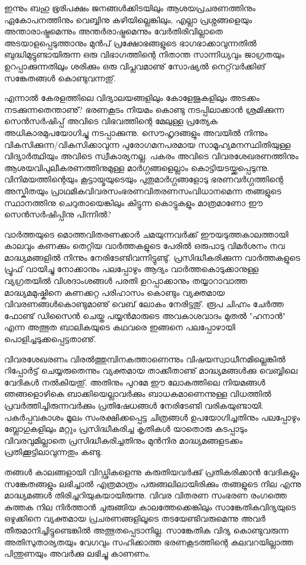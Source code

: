ഇന്നും ബഹു ഭൂരിപക്ഷം ജനങ്ങള്‍ക്കിടയിലും ആശയപ്രചരണത്തിനും ഏകോപനത്തിനും വെബ്ബിനു കഴിയില്ലെങ്കിലും, എല്ലാ 
പ്രശ്നങ്ങളെയും അന്താരാഷ്ട്രമെന്നും അന്തര്‍രാഷ്ട്രമെന്നും വേര്‍തിരിവില്ലാതെ അടയാളപ്പെടുത്താനും മുന്‍പ് പ്രക്ഷോഭങ്ങളുടെ 
ഭാഗഭാക്കാവുന്നതില്‍ ബുദ്ധിമുട്ടുണ്ടായിരുന്ന ഒരു വിഭാഗത്തിന്റെ നിതാന്ത സാന്നിധ്യവും ജാഗ്രതയും ഉറപ്പാക്കുന്നതിലും ശരിക്കും ഒരു 
വിപ്ലവമാണു് സോഷ്യല്‍ നെറ്റ്‌വര്‍ക്കിങ് സങ്കേതങ്ങള്‍ കൊണ്ടുവന്നതു്.

എന്നാല്‍ കേരളത്തിലെ വിദ്യാലയങ്ങളിലും കോളേജുകളിലും അടക്കം നടക്കുന്നതെന്താണു്? ഭരണകൂടം നിയമം കൊണ്ടു 
നടപ്പിലാക്കാന്‍ ശ്രമിക്കുന്ന സെന്‍സര്‍ഷിപ്പ് അവിടെ വിഭവത്തിന്റെ മേലുള്ള പ്രത്യേക അധികാരമുപയോഗിച്ചു നടപ്പാക്കുന്നു. 
സൌഹൃദങ്ങളും അവയില്‍ നിന്നും വികസിക്കുന്ന/വികസിക്കാവുന്ന പുരോഗമനപരമായ സാമൂഹ്യമനസ്ഥിതിയുള്ള വിദ്യാര്‍ത്ഥിയും 
അവിടെ സ്വീകാര്യനല്ല. പകരം അവിടെ വിവരശേഖരണത്തിനും ആശയവിപുലീകരണത്തിനുമുള്ള മാര്‍ഗ്ഗങ്ങളെല്ലാം 
കൊട്ടിയടയ്ക്കപ്പെടുന്നു. വിനിമയത്തിന്റെയും കൂട്ടായ്മയുടെയും പുതുമാര്‍ഗ്ഗങ്ങളോടു ഭരണവര്‍ഗ്ഗത്തിന്റെ അസ്കിതയും 
പ്രാഥമികവിവരസംഭരണവിതരണസംവിധാനമെന്ന തങ്ങളുടെ സ്ഥാനത്തിനു ചെറുതായെങ്കിലും കിട്ടുന്ന കൊട്ടുകളും 
മാത്രമാണോ ഈ സെന്‍സര്‍ഷിപ്പിനു പിന്നില്‍?

വാര്‍ത്തയുടെ മൊത്തവിതരണക്കാര്‍ ചമയുന്നവര്‍ക്ക് ഈയടുത്തകാലത്തായി കാലവും കണക്കും തെറ്റിയ വാര്‍ത്തകളുടെ പേരില്‍ 
ഒരുപാടു വിമര്‍ശനം നവ മാദ്ധ്യമങ്ങളില്‍ നിന്നും നേരിടേണ്ടിവന്നിട്ടുണ്ടു്. പ്രസിദ്ധീകരിക്കുന്ന വാര്‍ത്തകളുടെ പ്രൂഫ് വായിച്ചു നോക്കാനും 
പലപ്പോഴും ആദ്യം വാര്‍ത്തകൊടുക്കാനുള്ള വ്യഗ്രതയില്‍ വിശദാംശങ്ങള്‍ പരതി ഉറപ്പാക്കാനും തയ്യാറാവാത്ത മാദ്ധ്യമമുഷ്കിനെ 
കണക്കറ്റ പരിഹാസം കൊണ്ടും വ്യക്തമായ വിവരണങ്ങള്‍കൊണ്ടുമാണു് വെബ് ലോകം നേരിട്ടതു്. രൂപ ചിഹ്നം ചേര്‍ത്ത ഫോണ്ട് 
ഡിസൈന്‍ ചെയ്ത പയ്യന്‍മാരുടെ അവകാശവാദം മുതല്‍ "ഹനാന്‍" എന്ന അത്ഭുത ബാലികയുടെ കഥവരെ ഇങ്ങനെ പലപ്പോഴായി 
പൊളിച്ചടുക്കപ്പെട്ടതാണു്.

വിവര​ശേഖരണം വിരല്‍ത്തുമ്പിനകത്താണെന്നും വിഷയസ്വാധീനമില്ലെങ്കില്‍ റിപ്പോര്‍ട്ട് ചെയ്യരുതെന്നും വ്യക്തമായ താക്കീതാണു് 
മാദ്ധ്യമങ്ങള്‍ക്കു വെബ്ബിലെ വേദികള്‍ നല്‍കിയതു്. അതിനും പുറമേ ഈ ലോകത്തിലെ നിയമങ്ങള്‍ ഞങ്ങളൊഴികെ 
ബാക്കിയെല്ലാവര്‍ക്കും ബാധകമാണെന്നുള്ള വിധത്തില്‍ പ്രവര്‍ത്തിച്ചിരുന്നവര്‍ക്കും പ്രതിഷേധങ്ങള്‍ നേരിടേണ്ടി വരികയുണ്ടായി.
 പകര്‍പ്പവകാശം മൂലം സംരക്ഷിക്കപ്പെട്ട ചിത്രങ്ങള്‍ ഉപയോഗിച്ചതിനും പലപ്പോഴും ബ്ലോഗുകളിലും മറ്റും പ്രസിദ്ധീകരിച്ച കൃതികള്‍ 
യാതൊരു കടപ്പാടും വിവരവുമില്ലാതെ പ്രസിദ്ധീകരിച്ചതിനും മുന്‍നിര മാദ്ധ്യമങ്ങളടക്കം പ്രതിക്കൂട്ടിലാവുന്നതും കണ്ടു.

തങ്ങള്‍ കാലങ്ങളായി വിഡ്ഢികളെന്നു കരുതിയവര്‍ക്കു് പ്രതികരിക്കാന്‍ വേദികളും സങ്കേതങ്ങളും ലഭിച്ചാല്‍ എത്രമാത്രം 
പരുങ്ങലിലായിരിക്കും തങ്ങളുടെ നില എന്നു മാദ്ധ്യമങ്ങള്‍ തിരിച്ചറിയുകയായിരുന്നു. വിവര വിതരണ സംഭരണ രംഗത്തെ 
കുത്തക നില നിര്‍ത്താന്‍ ചുരുങ്ങിയ കാലത്തേക്കെങ്കിലും സാങ്കേതികവിദ്യയുടെ ഒഴുക്കിനെ വ്യക്തമായ പ്രചരണങ്ങളിലൂടെ 
തടയേണ്ടിവരുമെന്നു അവര്‍ തീരുമാനിച്ചിട്ടുണ്ടെങ്കില്‍ അത്ഭുതപ്പെടാനില്ല. സാങ്കേതിക വിദ്യ കൊണ്ടുവരുന്ന അതിസുതാര്യതയും 
വേഗവും സഹിക്കാത്ത ഭരണകൂടത്തിന്റെ കലവറയില്ലാത്ത പിന്തുണയും അവര്‍ക്കു ലഭിച്ചു കാണണം.

